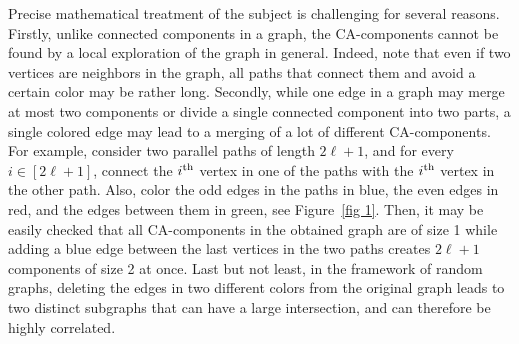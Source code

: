 \documentclass[10pt]{amsart}
\theoremstyle{definition}\newtheorem{defi}[theo]{Definition}\newtheorem{rema}[theo]{Remark}\newtheorem{exam}[theo]{Example}\newtheorem{exem}[theo]{Example}\newtheorem{nota}[theo]{Notation}
\newcommand{\rmm}[1]{\text{\normalfont #1}}
\begin{document}
Precise mathematical treatment of the subject is challenging for several reasons. Firstly, unlike connected components in a graph, the CA-components cannot be found by a local exploration of the graph in general. Indeed, note that even if two vertices are neighbors in the graph, all paths that connect them and avoid a certain color may be rather long. Secondly, while one edge in a graph may merge at most two components or divide a single connected component into two parts, a single colored edge may lead to a merging of a lot of different CA-components. For example, consider two parallel paths of length $2\ell+1$, and for every $i\in [2\ell+1]$, connect the $i^{\rmm{th}}$ vertex in one of the paths with the $i^{\rmm{th}}$ vertex in the other path. Also, color the odd edges in the paths in blue, the even edges in red, and the edges between them in green, see Figure~\ref{fig 1}. Then, it may be easily checked that all CA-components in the obtained graph are of size 1 while adding a blue edge between the last vertices in the two paths creates $2\ell+1$ components of size 2 at once. Last but not least, in the framework of random graphs, deleting the edges in two different colors from the original graph leads to two distinct subgraphs that can have a large intersection, and can therefore be highly correlated.
\end{document}
